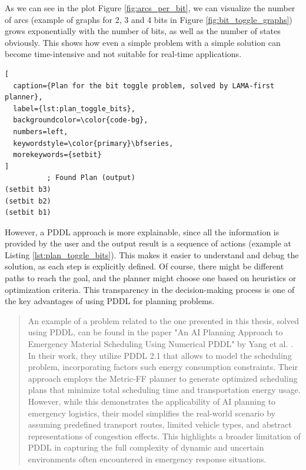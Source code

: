 As we can see in the plot Figure \ref{fig:arcs_per_bit}, we can visualize the
number of arcs (example of graphs for 2, 3 and 4 bits in Figure
\ref{fig:bit_toggle_graphs}) grows exponentially with the number of bits, as
well as the number of states obviously. This shows how even a simple problem with
a simple solution can become time-intensive and not suitable for real-time applications.

\begin{lstlisting}[
  caption={Plan for the bit toggle problem, solved by LAMA-first planner},
  label={lst:plan_toggle_bits},
  backgroundcolor=\color{code-bg},
  numbers=left,
  keywordstyle=\color{primary}\bfseries,
  morekeywords={setbit}
]
          ; Found Plan (output)
(setbit b3)
(setbit b2)
(setbit b1)
\end{lstlisting}

However, a PDDL approach is more explainable, since all the information is
provided by the user and the output result is a sequence of actions (example at Listing
\ref{lst:plan_toggle_bits}). This makes it easier to understand and debug the solution,
as each step is explicitly defined. Of course, there might be different paths to
reach the goal, and the planner might choose one based on heuristics or optimization
criteria. This transparency in the decision-making process is one of the key
advantages of using PDDL for planning problems.

\begin{quotation}
  An example of a problem related to the one presented in this thesis, solved
  using PDDL, can be found in the paper "An AI Planning Approach to Emergency
  Material Scheduling Using Numerical PDDL" by Yang et al. \cite{Yang2022}. In their
  work, they utilize PDDL 2.1 that allows to model the scheduling problem, incorporating
  factors such energy consumption constraints. Their approach employs the Metric-FF
  planner to generate optimized scheduling plans that minimize total scheduling
  time and transportation energy usage. However, while this demonstrates the
  applicability of AI planning to emergency logistics, their model simplifies the
  real-world scenario by assuming predefined transport routes, limited vehicle
  types, and abstract representations of congestion effects. This highlights a
  broader limitation of PDDL in capturing the full complexity of dynamic and
  uncertain environments often encountered in emergency response situations.
\end{quotation}

